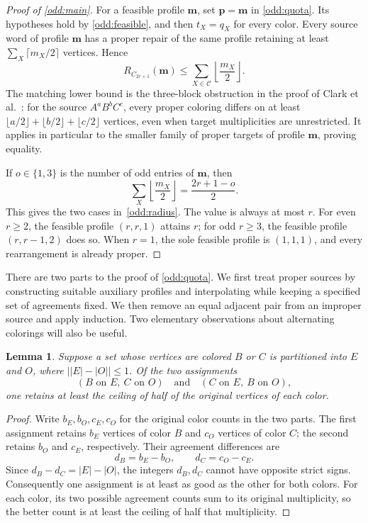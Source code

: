 \documentclass[11pt,reqno]{amsart}
\numberwithin{equation}{section}
\newtheorem{lemma}[theorem]{Lemma}
\theoremstyle{definition}
\theoremstyle{remark}
\begin{document}
\begin{proof}[Proof of \cref{odd:main}]
For a feasible profile $\mathbf m$, set $\mathbf p=\mathbf m$ in
\cref{odd:quota}. Its hypotheses hold by
\cref{odd:feasible}, and then $t_X=q_X$ for every color.
Every source word of profile $\mathbf m$
has a proper repair of the same profile retaining at least
$\sum_X\lceil m_X/2\rceil$ vertices. Hence
\[
R_{C_{2r+1}}(\mathbf m)
\le\sum_{X\in\mathcal C}\left\lfloor\frac{m_X}{2}\right\rfloor.
\]
The matching lower bound is the three-block obstruction in the proof
of Clark et al.~\cite[Proposition~3.5]{clark2006}: for the source
$A^aB^bC^c$, every proper coloring differs on at least
$\lfloor a/2\rfloor+\lfloor b/2\rfloor+\lfloor c/2\rfloor$
vertices, even when target multiplicities are unrestricted.
It applies in particular to the smaller family of proper targets of
profile $\mathbf m$, proving equality.

If $o\in\{1,3\}$ is the number of odd entries of $\mathbf m$, then
\[
\sum_X\left\lfloor\frac{m_X}{2}\right\rfloor
=\frac{2r+1-o}{2}.
\]
This gives the two cases in~\eqref{odd:radius}. The value is always
at most $r$. For even $r\ge2$, the feasible profile $(r,r,1)$ attains
$r$; for odd $r\ge3$, the feasible profile $(r,r-1,2)$ does so.
When $r=1$, the sole feasible profile is $(1,1,1)$, and every
rearrangement is already proper.
\end{proof}

There are two parts to the proof of \cref{odd:quota}. We first treat proper sources by
constructing suitable auxiliary profiles and interpolating while keeping
a specified set of agreements fixed. We then remove an equal adjacent
pair from an improper source and apply induction. Two elementary
observations about alternating colorings will also be useful.

\begin{lemma}\label{odd:binary}
Suppose a set whose vertices are colored $B$ or $C$ is partitioned
into $E$ and $O$, where $\bigl||E|-|O|\bigr|\le1$.
Of the two assignments
\[
(B\text{ on }E,\ C\text{ on }O)
\quad\text{and}\quad
(C\text{ on }E,\ B\text{ on }O),
\]
one retains at least the ceiling of half of the original vertices of
each color.
\end{lemma}
\begin{proof}
Write $b_E,b_O,c_E,c_O$ for the original color counts in the two
parts. The first assignment retains $b_E$ vertices of color $B$ and
$c_O$ vertices of color $C$; the second retains $b_O$ and $c_E$,
respectively. Their agreement differences are
\[
d_B=b_E-b_O,\qquad d_C=c_O-c_E.
\]
Since $d_B-d_C=|E|-|O|$, the integers $d_B,d_C$ cannot have opposite
strict signs. Consequently one assignment is at least as good as the
other for both colors. For each color, its two possible agreement
counts sum to its original multiplicity, so the better count is at
least the ceiling of half that multiplicity.
\end{proof}
\end{document}
